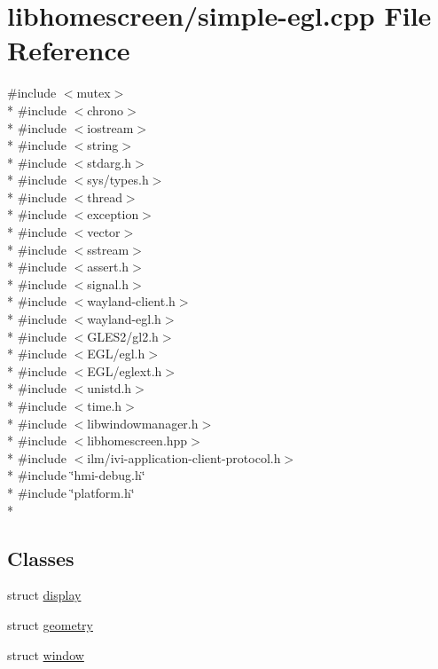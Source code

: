 \hypertarget{simple-egl_8cpp}{}\section{libhomescreen/simple-\/egl.cpp File Reference}
\label{simple-egl_8cpp}
{\ttfamily \#include $<$mutex$>$}\\*
{\ttfamily \#include $<$chrono$>$}\\*
{\ttfamily \#include $<$iostream$>$}\\*
{\ttfamily \#include $<$string$>$}\\*
{\ttfamily \#include $<$stdarg.\+h$>$}\\*
{\ttfamily \#include $<$sys/types.\+h$>$}\\*
{\ttfamily \#include $<$thread$>$}\\*
{\ttfamily \#include $<$exception$>$}\\*
{\ttfamily \#include $<$vector$>$}\\*
{\ttfamily \#include $<$sstream$>$}\\*
{\ttfamily \#include $<$assert.\+h$>$}\\*
{\ttfamily \#include $<$signal.\+h$>$}\\*
{\ttfamily \#include $<$wayland-\/client.\+h$>$}\\*
{\ttfamily \#include $<$wayland-\/egl.\+h$>$}\\*
{\ttfamily \#include $<$G\+L\+E\+S2/gl2.\+h$>$}\\*
{\ttfamily \#include $<$E\+G\+L/egl.\+h$>$}\\*
{\ttfamily \#include $<$E\+G\+L/eglext.\+h$>$}\\*
{\ttfamily \#include $<$unistd.\+h$>$}\\*
{\ttfamily \#include $<$time.\+h$>$}\\*
{\ttfamily \#include $<$libwindowmanager.\+h$>$}\\*
{\ttfamily \#include $<$libhomescreen.\+hpp$>$}\\*
{\ttfamily \#include $<$ilm/ivi-\/application-\/client-\/protocol.\+h$>$}\\*
{\ttfamily \#include \char`\"{}hmi-\/debug.\+h\char`\"{}}\\*
{\ttfamily \#include \char`\"{}platform.\+h\char`\"{}}\\*
\subsection*{Classes}
\begin{DoxyCompactItemize}
\item 
struct \hyperlink{structdisplay}{display}
\item 
struct \hyperlink{structgeometry}{geometry}
\item 
struct \hyperlink{structwindow}{window}
\end{DoxyCompactItemize}
